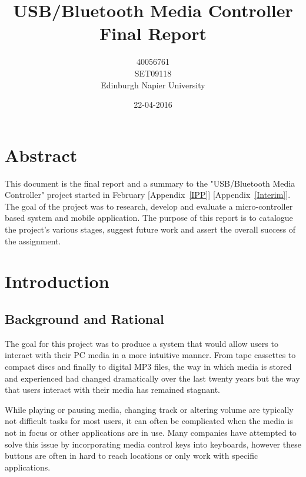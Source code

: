 \documentclass{article}
\title{USB/Bluetooth Media Controller\\Final Report}
\author{40056761\\SET09118\\Edinburgh Napier University}
\date{22-04-2016}
\begin{document}
		
	\maketitle
	
	\section*{Abstract}	
		This document is the final report and a summary to the "USB/Bluetooth Media Controller" project started in February [Appendix~\ref{IPP}] [Appendix~\ref{Interim}]. The goal of the project was to research, develop and evaluate a micro-controller based system and mobile application. The purpose of this report is to catalogue the project’s various stages, suggest future work and assert the overall success of the assignment.
					
	
	\newpage
		
		
	\tableofcontents
	
	\newpage 
	
	\listoffigures
	
	\listoftables
	
	\lstlistoflistings
		
	\newpage
		
	\section{Introduction}
		\subsection{Background and Rational}
			The goal for this project was to produce a system that would allow users to interact with their PC media in a more intuitive manner. From tape cassettes to compact discs and finally to digital MP3 files, the way in which media is stored and experienced had changed dramatically over the last twenty years but the way that users interact with their media has remained stagnant.
			
			While playing or pausing media, changing track or altering volume are typically not difficult tasks for most users, it can often be complicated when the media is not in focus or other applications are in use. Many companies have attempted to solve this issue by incorporating media control keys into keyboards, however these buttons are often in hard to reach locations or only work with specific applications.
			
\end{document}
